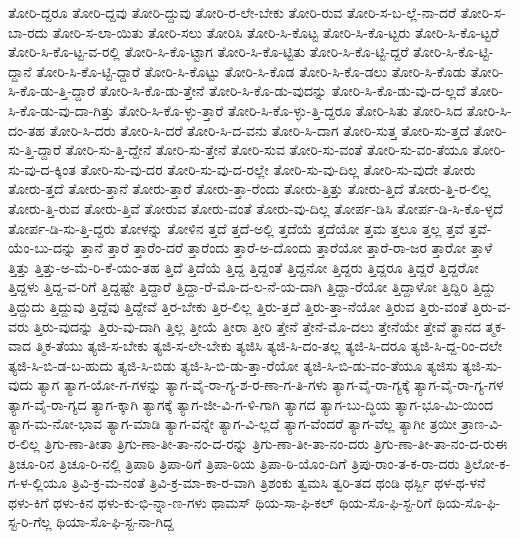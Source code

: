 {ತೋರಿ-ದ್ದರೂ
ತೋರಿ-ದ್ದವು
ತೋರಿ-ದ್ದುವು
ತೋರಿ-ರ-ಲೇ-ಬೇಕು
ತೋರಿ-ರುವ
ತೋರಿ-ಸ-ಬ-ಲ್ಲೆ-ನಾ-ದರೆ
ತೋರಿ-ಸ-ಬಾ-ರದು
ತೋರಿ-ಸ-ಲಾ-ಯಿತು
ತೋರಿ-ಸಲು
ತೋರಿಸಿ
ತೋರಿ-ಸಿ-ಕೊಟ್ಟ
ತೋರಿ-ಸಿ-ಕೊ-ಟ್ಟರು
ತೋರಿ-ಸಿ-ಕೊ-ಟ್ಟರೆ
ತೋರಿ-ಸಿ-ಕೊ-ಟ್ಟ-ವ-ರಲ್ಲಿ
ತೋರಿ-ಸಿ-ಕೊ-ಟ್ಟಾಗ
ತೋರಿ-ಸಿ-ಕೊ-ಟ್ಟಿತು
ತೋರಿ-ಸಿ-ಕೊ-ಟ್ಟಿ-ದ್ದರೆ
ತೋರಿ-ಸಿ-ಕೊ-ಟ್ಟಿ-ದ್ದಾನೆ
ತೋರಿ-ಸಿ-ಕೊ-ಟ್ಟಿ-ದ್ದಾರೆ
ತೋರಿ-ಸಿ-ಕೊಟ್ಟು
ತೋರಿ-ಸಿ-ಕೊಡ
ತೋರಿ-ಸಿ-ಕೊ-ಡಲು
ತೋರಿ-ಸಿ-ಕೊಡು
ತೋರಿ-ಸಿ-ಕೊ-ಡು-ತ್ತಿ-ದ್ದಾರೆ
ತೋರಿ-ಸಿ-ಕೊ-ಡು-ತ್ತೇನೆ
ತೋರಿ-ಸಿ-ಕೊ-ಡು-ವುದನ್ನು
ತೋರಿ-ಸಿ-ಕೊ-ಡು-ವು-ದ-ಲ್ಲದೆ
ತೋರಿ-ಸಿ-ಕೊ-ಡು-ವು-ದಾ-ಗಿತ್ತು
ತೋರಿ-ಸಿ-ಕೊ-ಳ್ಳು-ತ್ತಾರೆ
ತೋರಿ-ಸಿ-ಕೊ-ಳ್ಳು-ತ್ತಿ-ದ್ದರೂ
ತೋರಿ-ಸಿತು
ತೋರಿ-ಸಿದ
ತೋರಿ-ಸಿ-ದಂ-ತಹ
ತೋರಿ-ಸಿ-ದರು
ತೋರಿ-ಸಿ-ದರೆ
ತೋರಿ-ಸಿ-ದ-ವನು
ತೋರಿ-ಸಿ-ದಾಗ
ತೋರಿ-ಸುತ್ತ
ತೋರಿ-ಸು-ತ್ತದೆ
ತೋರಿ-ಸು-ತ್ತಿ-ದ್ದಾರೆ
ತೋರಿ-ಸು-ತ್ತಿ-ದ್ದೇನೆ
ತೋರಿ-ಸು-ತ್ತೇನೆ
ತೋರಿ-ಸುವ
ತೋರಿ-ಸು-ವಂತೆ
ತೋರಿ-ಸು-ವಂ-ತೆಯೂ
ತೋರಿ-ಸು-ವು-ದ-ಕ್ಕಿಂತ
ತೋರಿ-ಸು-ವು-ದರ
ತೋರಿ-ಸು-ವು-ದ-ರಲ್ಲೇ
ತೋರಿ-ಸು-ವು-ದಿಲ್ಲ
ತೋರಿ-ಸು-ವುದೇ
ತೋರು
ತೋರು-ತ್ತದೆ
ತೋರು-ತ್ತಾನೆ
ತೋರು-ತ್ತಾರೆ
ತೋರು-ತ್ತಾ-ರೆಂದು
ತೋರು-ತ್ತಿತ್ತು
ತೋರು-ತ್ತಿದೆ
ತೋರು-ತ್ತಿ-ರ-ಲಿಲ್ಲ
ತೋರು-ತ್ತಿ-ರುವ
ತೋರು-ತ್ತಿವೆ
ತೋರುವ
ತೋರು-ವಂತೆ
ತೋರು-ವು-ದಿಲ್ಲ
ತೋರ್ಪ-ಡಿಸಿ
ತೋರ್ಪ-ಡಿ-ಸಿ-ಕೊ-ಳ್ಳದೆ
ತೋರ್ಪ-ಡಿ-ಸು-ತ್ತಿ-ದ್ದರು
ತೋಳನ್ನು
ತೋಳಿನ
ತ್ತದೆ
ತ್ತದೆ-ಅಲ್ಲಿ
ತ್ತದೆಯೆ
ತ್ತದೆಯೋ
ತ್ತಮ
ತ್ತಲೂ
ತ್ತಲ್ಲ
ತ್ತವೆ
ತ್ತವೆ-ಯೆಂ-ಬು-ದನ್ನು
ತ್ತಾನೆ
ತ್ತಾರೆ
ತ್ತಾರೆಂ-ದರೆ
ತ್ತಾರೆಂದು
ತ್ತಾರೆ-ಅ-ದೊಂದು
ತ್ತಾರೆಯೋ
ತ್ತಾರೆ-ರಾ-ಜರ
ತ್ತಾರೋ
ತ್ತಾಳೆ
ತ್ತಿತ್ತು
ತ್ತಿತ್ತು-ಅ-ಮೆ-ರಿ-ಕೆ-ಯಂ-ತಹ
ತ್ತಿದೆ
ತ್ತಿದೆಯೆ
ತ್ತಿದ್ದ
ತ್ತಿದ್ದಂತೆ
ತ್ತಿದ್ದನೋ
ತ್ತಿದ್ದರು
ತ್ತಿದ್ದರೂ
ತ್ತಿದ್ದರೆ
ತ್ತಿದ್ದರೋ
ತ್ತಿದ್ದಳು
ತ್ತಿದ್ದ-ವ-ರಿಗೆ
ತ್ತಿದ್ದಷ್ಟೇ
ತ್ತಿದ್ದಾರೆ
ತ್ತಿದ್ದಾ-ರೆ-ಮೊ-ದ-ಲ-ನೆ-ಯ-ದಾಗಿ
ತ್ತಿದ್ದಾ-ರೆಯೋ
ತ್ತಿದ್ದಾಳೋ
ತ್ತಿದ್ದಿರಿ
ತ್ತಿದ್ದು
ತ್ತಿದ್ದುದು
ತ್ತಿದ್ದುವು
ತ್ತಿದ್ದೆವು
ತ್ತಿದ್ದೇವೆ
ತ್ತಿರ-ಬೇಕು
ತ್ತಿರ-ಲಿಲ್ಲ
ತ್ತಿರು-ತ್ತದೆ
ತ್ತಿರು-ತ್ತಾ-ನೆಯೋ
ತ್ತಿರುವ
ತ್ತಿರು-ವಂತೆ
ತ್ತಿರು-ವ-ವರು
ತ್ತಿರು-ವುದನ್ನು
ತ್ತಿರು-ವು-ದಾಗಿ
ತ್ತಿಲ್ಲ
ತ್ತೀಯೆ
ತ್ತೀರಾ
ತ್ತೀರಿ
ತ್ತೇನೆ
ತ್ತೇನೆ-ಮೊ-ದಲು
ತ್ತೇನೆಯೇ
ತ್ತೇವೆ
ತ್ಥಾನದ
ತ್ಮಕ-ವಾದ
ತ್ಮಿಕ-ತೆಯು
ತ್ಯಜಿ-ಸ-ಬೇಕು
ತ್ಯಜಿ-ಸ-ಲೇ-ಬೇಕು
ತ್ಯಜಿಸಿ
ತ್ಯಜಿ-ಸಿ-ದಂ-ತಲ್ಲ
ತ್ಯಜಿ-ಸಿ-ದರೂ
ತ್ಯಜಿ-ಸಿ-ದ್ದ-ರಿಂ-ದಲೇ
ತ್ಯಜಿ-ಸಿ-ಬಿ-ಡ-ಬ-ಹುದು
ತ್ಯಜಿ-ಸಿ-ಬಿಡು
ತ್ಯಜಿ-ಸಿ-ಬಿ-ಡು-ತ್ತಾ-ರೆಯೋ
ತ್ಯಜಿ-ಸಿ-ಬಿ-ಡು-ವಂ-ತೆಯೂ
ತ್ಯಜಿಸು
ತ್ಯಜಿ-ಸು-ವುದು
ತ್ಯಾಗ
ತ್ಯಾಗ-ಯೋ-ಗ-ಗಳನ್ನು
ತ್ಯಾಗ-ವೈ-ರಾ-ಗ್ಯ-ಶ-ರ-ಣಾ-ಗ-ತಿ-ಗಳು
ತ್ಯಾಗ-ವೈ-ರಾ-ಗ್ಯಕ್ಕೆ
ತ್ಯಾಗ-ವೈ-ರಾ-ಗ್ಯ-ಗಳ
ತ್ಯಾಗ-ವೈ-ರಾ-ಗ್ಯದ
ತ್ಯಾಗ-ಕ್ಕಾಗಿ
ತ್ಯಾಗಕ್ಕೆ
ತ್ಯಾಗ-ಜೀ-ವಿ-ಗ-ಳಿ-ಗಾಗಿ
ತ್ಯಾಗದ
ತ್ಯಾಗ-ಬು-ದ್ಧಿಯ
ತ್ಯಾಗ-ಭೂ-ಮಿ-ಯಿಂದ
ತ್ಯಾಗ-ಮ-ನೋ-ಭಾವ
ತ್ಯಾಗ-ಮಾಡಿ
ತ್ಯಾಗ-ವನ್ನೇ
ತ್ಯಾಗ-ವಿ-ಲ್ಲದೆ
ತ್ಯಾಗ-ವೆಂದರೆ
ತ್ಯಾಗ-ವೆಲ್ಲ
ತ್ಯಾಗೀ
ತ್ರಯೀ
ತ್ರಾಣ-ವಿ-ರ-ಲಿಲ್ಲ
ತ್ರಿಗು-ಣಾ-ತೀತಾ
ತ್ರಿಗು-ಣಾ-ತೀ-ತಾ-ನಂ-ದ-ರನ್ನು
ತ್ರಿಗು-ಣಾ-ತೀ-ತಾ-ನಂ-ದರು
ತ್ರಿಗು-ಣಾ-ತೀ-ತಾ-ನಂ-ದ-ರುಈ
ತ್ರಿಚೂ-ರಿನ
ತ್ರಿಚೂ-ರಿ-ನಲ್ಲಿ
ತ್ರಿಪಾಠಿ
ತ್ರಿಪಾ-ಠಿಗೆ
ತ್ರಿಪಾ-ಠಿಯ
ತ್ರಿಪಾ-ಠಿ-ಯೊಂ-ದಿಗೆ
ತ್ರಿಪು-ರಾಂ-ತ-ಕ-ರಾ-ದರು
ತ್ರಿಲೋ-ಕ-ಗ-ಳ-ಲ್ಲಿಯೂ
ತ್ರಿವಿ-ಕ್ರ-ಮ-ನಂತೆ
ತ್ರಿವಿ-ಕ್ರ-ಮಾ-ಕಾ-ರ-ವಾಗಿ
ತ್ರಿಶಂಕು
ತ್ವಮಸಿ
ತ್ವರಿ-ತದ
ಥಂಡಿ
ಥರ್ಸ್ಬಿ
ಥಳ-ಥ-ಳನೆ
ಥಳು-ಕಿಗೆ
ಥಳು-ಕಿನ
ಥಳು-ಕು-ಭಿ-ನ್ನಾ-ಣ-ಗಳು
ಥಾಮಸ್
ಥಿಯ-ಸಾ-ಫಿ-ಕಲ್
ಥಿಯ-ಸೊ-ಫಿ-ಸ್ಟ-ರಿಗೆ
ಥಿಯ-ಸೊ-ಫಿ-ಸ್ಟ-ರಿ-ಗೆಲ್ಲ
ಥಿಯಾ-ಸೊ-ಫಿ-ಸ್ಟ-ನಾ-ಗಿದ್ದ
}
